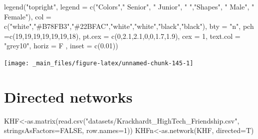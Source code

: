 \documentclass[
  notitlepage,
  onecolumn,
  openany]{book}
\newenvironment{Shaded}{\begin{snugshade}}{\end{snugshade}}
\newcommand{\AttributeTok}[1]{\textcolor[rgb]{0.77,0.63,0.00}{#1}}
\newcommand{\ConstantTok}[1]{\textcolor[rgb]{0.00,0.00,0.00}{#1}}
\newcommand{\DecValTok}[1]{\textcolor[rgb]{0.00,0.00,0.81}{#1}}
\newcommand{\FloatTok}[1]{\textcolor[rgb]{0.00,0.00,0.81}{#1}}
\newcommand{\FunctionTok}[1]{\textcolor[rgb]{0.00,0.00,0.00}{#1}}
\newcommand{\NormalTok}[1]{#1}
\newcommand{\OtherTok}[1]{\textcolor[rgb]{0.56,0.35,0.01}{#1}}
\newcommand{\StringTok}[1]{\textcolor[rgb]{0.31,0.60,0.02}{#1}}
\begin{document}
\begin{Shaded}
\begin{Highlighting}[]
\FunctionTok{legend}\NormalTok{(}\StringTok{"topright"}\NormalTok{,}
       \AttributeTok{legend =} \FunctionTok{c}\NormalTok{(}\StringTok{"Colors"}\NormalTok{,}\StringTok{" Senior"}\NormalTok{, }\StringTok{" Junior"}\NormalTok{, }\StringTok{" "}\NormalTok{,}\StringTok{"Shapes"}\NormalTok{, }\StringTok{" Male"}\NormalTok{, }\StringTok{" Female"}\NormalTok{),}
       \AttributeTok{col =} \FunctionTok{c}\NormalTok{(}\StringTok{"white"}\NormalTok{,}\StringTok{"\#B78FB3"}\NormalTok{,}\StringTok{"\#22BFAC"}\NormalTok{,}\StringTok{"white"}\NormalTok{,}\StringTok{"white"}\NormalTok{,}\StringTok{"black"}\NormalTok{,}\StringTok{"black"}\NormalTok{), }
       \AttributeTok{bty =} \StringTok{"n"}\NormalTok{, }
       \AttributeTok{pch =}\FunctionTok{c}\NormalTok{(}\DecValTok{19}\NormalTok{,}\DecValTok{19}\NormalTok{,}\DecValTok{19}\NormalTok{,}\DecValTok{19}\NormalTok{,}\DecValTok{19}\NormalTok{,}\DecValTok{19}\NormalTok{,}\DecValTok{18}\NormalTok{),}
       \AttributeTok{pt.cex =} \FunctionTok{c}\NormalTok{(}\DecValTok{0}\NormalTok{,}\FloatTok{2.1}\NormalTok{,}\FloatTok{2.1}\NormalTok{,}\DecValTok{0}\NormalTok{,}\DecValTok{0}\NormalTok{,}\FloatTok{1.7}\NormalTok{,}\FloatTok{1.9}\NormalTok{), }
       \AttributeTok{cex =} \DecValTok{1}\NormalTok{, }
       \AttributeTok{text.col =} \StringTok{"grey10"}\NormalTok{, }
       \AttributeTok{horiz =}\NormalTok{ F , }
       \AttributeTok{inset =} \FunctionTok{c}\NormalTok{(}\FloatTok{0.01}\NormalTok{))}
\end{Highlighting}
\end{Shaded}

\begin{center}\texttt{[image: \_main\_files/figure-latex/unnamed-chunk-145-1]} \end{center}

\hypertarget{directed-networks}{%
\section{Directed networks}\label{directed-networks}}

\begin{Shaded}
\begin{Highlighting}[]
\NormalTok{KHF}\OtherTok{\textless{}{-}}\FunctionTok{as.matrix}\NormalTok{(}\FunctionTok{read.csv}\NormalTok{(}\StringTok{"datasets/Krackhardt\_HighTech\_Friendship.csv"}\NormalTok{,}
                        \AttributeTok{stringsAsFactors=}\ConstantTok{FALSE}\NormalTok{, }\AttributeTok{row.names=}\DecValTok{1}\NormalTok{))}
\NormalTok{KHFn}\OtherTok{\textless{}{-}}\FunctionTok{as.network}\NormalTok{(KHF, }\AttributeTok{directed=}\NormalTok{T)}
\end{Highlighting}
\end{Shaded}
\end{document}
